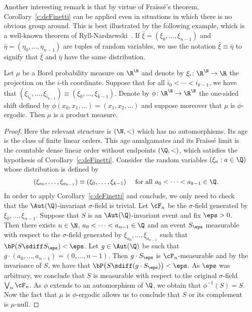 Another interesting remark is that by virtue of Fraïssé's theorem, Corollary~\ref{c:deFinetti} can be applied even in situations in which there is no obvious group around. This is best illustrated by the following example, which is a well-known theorem of Ryll-Nardzewski~\cite{RyllNardzewski1957}. If $\bar \xi = (\xi_0, \ldots, \xi_{n-1})$ and $\bar \eta = (\eta_0, \ldots, \eta_{n-1})$ are tuples of random variables, we use the notation $\bar \xi \equiv \bar \eta$ to signify that $\bar \xi$ and $\bar \eta$ have the same distribution.
\begin{cor}
\label{c:RyllNardzewski}
Let $\mu$ be a Borel probability measure on $\R^\N$ and denote by $\xi_i \colon \R^\N \to \R$ the projection on the $i$-th coordinate. Suppose that for all $i_0 < \cdots < i_{k-1}$, we have that $(\xi_{i_0}, \ldots, \xi_{i_{k-1}}) \equiv (\xi_0, \ldots, \xi_{k-1})$. Denote by $\phi \colon \R^\N \to \R^\N$ the one-sided shift defined by $\phi(x_0, x_1, \ldots) = (x_1, x_2, \ldots)$ and suppose moreover that $\mu$ is $\phi$-ergodic. Then $\mu$ is a product measure.
\end{cor}
\begin{proof}
Here the relevant structure is $(\N, <)$ which has no automorphisms. Its age is the class of finite linear orders. This age amalgamates and its Fraïssé limit is the countable dense linear order without endpoints $(\Q, <)$, which satisfies the hypothesis of Corollary~\ref{c:deFinetti}. Consider the random variables $(\xi_a : a \in \Q)$ whose distribution is defined by
\begin{equation*}
(\xi_{a_0}, \ldots, \xi_{a_{k-1}}) \equiv (\xi_0, \ldots, \xi_{k-1}) \quad \text{ for all } a_0 < \cdots < a_{k-1} \in \Q.
\end{equation*}
In order to apply Corollary~\ref{c:deFinetti} and conclude, we only need to check that the $\Aut(\Q)$-invariant $\sigma$-field is trivial. Let $\cF_n$ be the $\sigma$-field generated by $\xi_0, \ldots, \xi_{n-1}$. Suppose that $S$ is an $\Aut(\Q)$-invariant event and fix $\eps > 0$. Then there exists $n \in \N$, $a_0 < \cdots < a_{n-1} \in \Q$ and an event $S_\eps$ measurable with respect to the $\sigma$-field generated by $\xi_{a_0}, \ldots, \xi_{a_{n-1}}$ such that $\bP(S \sdiff S_\eps) < \eps$. Let $g \in \Aut(\Q)$ be such that $g \cdot (a_0, \ldots, a_{n-1}) = (0, \ldots, n-1)$. Then $g \cdot S_\eps$ is $\cF_n$-measurable and by the invariance of $S$, we have that $\bP \big(S \sdiff (g \cdot S_\eps) \big) < \eps$. As $\eps$ was arbitrary, we conclude that $S$ is measurable with respect to the original $\sigma$-field $\bigvee_n \cF_n$. As $\phi$ extends to an automorphism of $\Q$, we obtain that $\phi^{-1}(S) = S$. Now the fact that $\mu$ is $\phi$-ergodic allows us to conclude that $S$ or its complement is $\mu$-null.
\end{proof}

